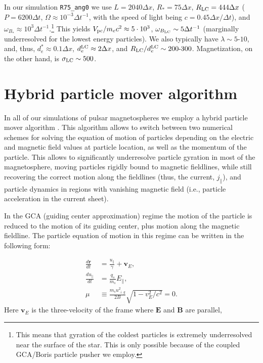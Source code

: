 In our simulation \texttt{R75\_ang0} we use $L=2040\Delta x$, $R_*=75\Delta x$, $R_{\rm LC}=444\Delta x$ ($P=6200\Delta t$, $\Omega \approx 10^{-3}\Delta t^{-1}$, with the speed of light being $c=0.45\Delta x / \Delta t$), and $\omega_{B_*}\approx 10^3\Delta t^{-1}$.\footnote{This means that gyration of the coldest particles is extremely underresolved near the surface of the star. This is only possible because of the coupled GCA/Boris particle pusher we employ.} This yields $V_{\rm pc}/m_e c^2 \approx 5\cdot 10^3$, $\omega_{B_{\rm LC}}\sim 5\Delta t^{-1}$ (marginally underresolved for the lowest energy particles). We also typically have $\lambda \sim 5\text{-}10$, and, thus, $d_e^*\approx 0.1\Delta x$, $d_e^{\rm LC}\approx 2\Delta x$, and $R_{\rm LC}/d_e^{\rm LC}\sim 200\text{-}300$. Magnetization, on the other hand, is $\sigma_{\rm LC}\sim 500$.

\section{Hybrid particle mover algorithm}
\label{appendix:psr-gcaalg}

In all of our simulations of pulsar magnetospheres we employ a hybrid particle mover algorithm \cite{2020ApJS..251...10B}. This algorithm allows to switch between two numerical schemes for solving the equation of motion of particles depending on the electric and magnetic field values at particle location, as well as the momentum of the particle. This allows to significantly underresolve particle gyration in most of the magnetosphere, moving particles rigidly bound to magnetic fieldlines, while still recovering the correct motion along the fieldlines (thus, the current, $j_\parallel$), and particle dynamics in regions with vanishing magnetic field (i.e., particle acceleration in the current sheet).

In the GCA (guiding center approximation) regime the motion of the particle is reduced to the motion of its guiding center, plus motion along the magnetic fieldline. The particle equation of motion in this regime can be written in the following form:

\begin{equation}
    \begin{aligned}
        \frac{d \bm{r}}{d t} &= \frac{u_\parallel}{\gamma} + \bm{v}_E,\\
        \frac{d u_\parallel}{d t} &= \frac{q_s}{m_s} E_\parallel,\\
        \mu &\equiv \frac{m_s u_{\perp g}^2}{2 B}\sqrt{1- v_E^2 / c^2} = 0.
    \end{aligned}
\end{equation}
\noindent Here $\bm{v}_E$ is the three-velocity of the frame where $\bm{E}$ and $\bm{B}$ are parallel,

